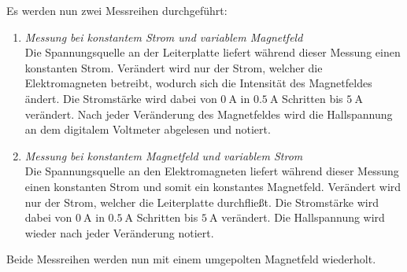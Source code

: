 %
Es werden nun zwei Messreihen durchgeführt:
\begin{enumerate}
    \item \textit{Messung bei konstantem Strom und variablem Magnetfeld}\\
        Die Spannungsquelle an der Leiterplatte liefert während dieser Messung einen konstanten Strom. 
        Verändert wird nur der Strom, welcher die Elektromagneten betreibt, wodurch sich die Intensität
        des Magnetfeldes ändert. Die Stromstärke wird dabei von $\SI{0}{\ampere}$ in $\SI{0.5}{\ampere}$
        Schritten bis $\SI{5}{\ampere}$ verändert. Nach jeder Veränderung des Magnetfeldes wird die 
        Hallspannung an dem digitalem Voltmeter abgelesen und notiert.\\
    \item \textit{Messung bei konstantem Magnetfeld und variablem Strom}\\
        Die Spannungsquelle an den Elektromagneten liefert während dieser Messung einen konstanten Strom und 
        somit ein konstantes Magnetfeld. 
        Verändert wird nur der Strom, welcher die Leiterplatte durchfließt.
        Die Stromstärke wird dabei von $\SI{0}{\ampere}$ in $\SI{0.5}{\ampere}$
        Schritten bis $\SI{5}{\ampere}$ verändert. Die Hallspannung wird wieder nach jeder Veränderung
        notiert.\\
\end{enumerate}
Beide Messreihen werden nun mit einem umgepolten Magnetfeld wiederholt.